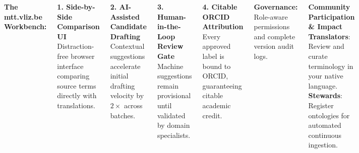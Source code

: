 \documentclass[
  25pt,
  a0paper,
  portrait,
  margin=0mm,
  innermargin=15mm,
  blockverticalspace=8mm,
  colspace=10mm,
  subcolspace=8mm
]{tikzposter}
\begin{document}
\begin{columns}
{    \vspace{0.18cm}
    \textbf{The mtt.vliz.be Workbench:}
    \vspace{0.12cm}

    \begin{tcolorbox}[colback=vlizHeroBg,colframe=vlizBorder,arc=4mm,boxrule=1.5pt,left=5mm,right=5mm,top=3.0mm,bottom=3.0mm]
      {\color{vlizNavy}\bfseries 1. Side-by-Side Comparison UI}\\[2pt]
      {\small Distraction-free browser interface comparing source terms directly with translations.}
    \end{tcolorbox}
    \vspace{0.12cm}
    \begin{tcolorbox}[colback=vlizHeroBg,colframe=vlizBorder,arc=4mm,boxrule=1.5pt,left=5mm,right=5mm,top=3.0mm,bottom=3.0mm]
      {\color{vlizNavy}\bfseries 2. AI-Assisted Candidate Drafting}\\[2pt]
      {\small Contextual suggestions accelerate initial drafting velocity by $2\times$ across batches.}
    \end{tcolorbox}
    \vspace{0.12cm}
    \begin{tcolorbox}[colback=vlizHeroBg,colframe=vlizBorder,arc=4mm,boxrule=1.5pt,left=5mm,right=5mm,top=3.0mm,bottom=3.0mm]
      {\color{vlizNavy}\bfseries 3. Human-in-the-Loop Review Gate}\\[2pt]
      {\small Machine suggestions remain provisional until validated by domain specialists.}
    \end{tcolorbox}
    \vspace{0.12cm}
    \begin{tcolorbox}[colback=vlizHeroBg,colframe=vlizBorder,arc=4mm,boxrule=1.5pt,left=5mm,right=5mm,top=3.0mm,bottom=3.0mm]
      {\color{vlizNavy}\bfseries 4. Citable ORCID Attribution}\\[2pt]
      {\small Every approved label is bound to ORCID, guaranteeing citable academic credit.}
    \end{tcolorbox}

    \vspace{0.18cm}
    \textbf{Governance:} Role-aware permissions and complete version audit logs.

    \vspace{0.12cm}
    \begin{tcolorbox}[colback=vlizLightTeal,colframe=vlizTeal,arc=4mm,boxrule=1.5pt,left=5mm,right=5mm,top=3.0mm,bottom=3.0mm]
      {\color{vlizNavy}\bfseries Community Participation \& Impact}\\[2pt]
      {\small \textbf{Translators}: Review and curate terminology in your native language.\\
      \textbf{Stewards}: Register ontologies for automated continuous ingestion.}
    \end{tcolorbox}
    \vspace*{1.8mm}
  }


\end{columns}
\end{document}

